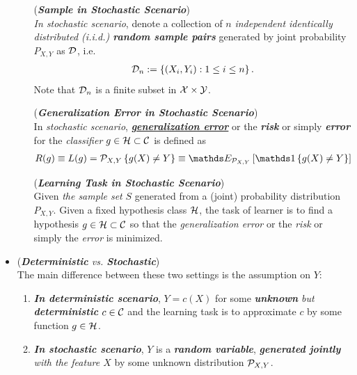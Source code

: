 \documentclass[11pt]{article}
\begin{document}
\begin{itemize}
\begin{enumerate}
\begin{remark} (\emph{\textbf{Sample in Stochastic Scenario}})\\
\emph{In stochastic scenario}, denote a collection of $n$ \emph{independent identically distributed (i.i.d.) \textbf{random sample pairs}} generated by joint probability $P_{X, Y}$ as ${\mathcal D}$, i.e. 
\begin{align*}
{\mathcal D}_n:= \left\{(X_i, Y_i): 1\le i\le n\right\}.
\end{align*}
 Note that ${\mathcal D}_n$ is a finite subset in ${\mathcal X} \times {\mathcal Y}$.
\end{remark}

\begin{definition} (\emph{\textbf{Generalization Error in Stochastic Scenario}})  \citep{mohri2018foundations}\\
In \emph{stochastic scenario}, \underline{\emph{\textbf{generalization error}}} or the \emph{\textbf{risk}} or simply \emph{\textbf{error}} for the \emph{classifier} $g\in {\mathcal H} \subset {\mathcal C}$ is defined as
\begin{align}
R(g)\equiv L(g) &= \cP_{X, Y}\set{g(X) \neq Y}\equiv \E{\cP_{X, Y}}{\ind{g(X)\neq Y}} \label{expr: gen_err_gener}
\end{align}
\end{definition}

\begin{remark} (\emph{\textbf{Learning Task in Stochastic Scenario}})\\
Given \emph{the sample set} $S$ generated from a (joint) probability distribution $P_{X, Y}$. Given a fixed hypothesis class ${\mathcal H}$, the task of learner is to find a hypothesis $g\in {\mathcal H} \subset {\mathcal C}$ so that the \emph{\emph{generalization error}} or the \emph{risk} or simply the \emph{error} is minimized. 
\end{remark}
\end{enumerate}

\item \begin{remark} (\emph{\textbf{Deterministic} vs. \textbf{Stochastic}})\\
The main difference between these two settings is the assumption on $Y$:
\begin{enumerate}
\item \emph{\textbf{In deterministic scenario}}, $Y = c(X)$ for some \emph{\textbf{unknown} but \textbf{deterministic}} $c \in {\mathcal C}$ and the learning task is to approximate $c$ by some function $g \in {\mathcal H}$.

\item \emph{\textbf{In stochastic scenario}}, $Y$ is a \emph{\textbf{random variable}}, \emph{\textbf{generated jointly} with the feature $X$} by some unknown distribution ${\mathcal P}_{X, Y}$. 


\end{enumerate}
\end{remark}
\end{itemize}
\end{document}
